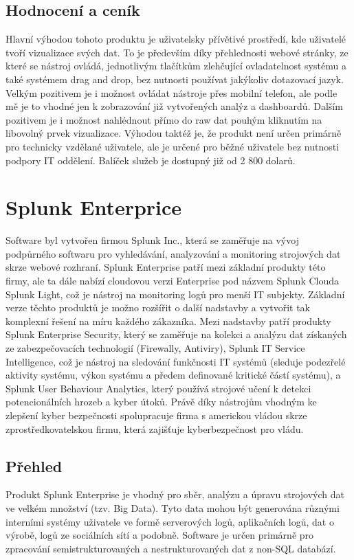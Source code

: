 \documentclass[czech,BP]{thesiskiv}
\begin{document}
\subsection{Hodnocení a ceník}
Hlavní výhodou tohoto produktu je uživatelsky přívětivé prostředí, kde uživatelé tvoří vizualizace svých dat. To je především díky přehlednosti webové stránky, ze které se nástroj ovládá, jednotlivým tlačítkům zlehčující ovladatelnost systému a také systémem drag and drop, bez nutnosti používat jakýkoliv dotazovací jazyk. Velkým pozitivem je i možnost ovládat nástroje přes mobilní telefon, ale podle mě je to vhodné jen k zobrazování již vytvořených analýz a dashboardů. Dalším pozitivem je i možnost nahlédnout přímo do raw dat pouhým kliknutím na libovolný prvek vizualizace. Výhodou taktéž je, že produkt není určen primárně pro technicky vzdělané uživatele, ale je určené pro běžné uživatele bez nutnosti podpory IT oddělení. Balíček služeb je dostupný již od 2 800 dolarů.\cite{InetCenik}

\section{Splunk Enterprice}
Software byl vytvořen firmou Splunk Inc., která se zaměřuje na vývoj podpůrného softwaru pro vyhledávání, analyzování a monitoring strojových dat skrze webové rozhraní.\cite{Splunk_a_kompatibilita} Splunk Enterprise patří mezi základní produkty této firmy, ale ta dále nabízí cloudovou verzi Enterprise pod názvem Splunk Cloud\texttrademark a Splunk Light, což je nástroj na monitoring logů pro menší IT subjekty. Základní verze těchto produktů je možno rozšířit o další nadstavby a vytvořit tak komplexní řešení na míru každého zákazníka. Mezi nadstavby patří produkty Splunk Enterprise Security, který se zaměřuje na kolekci a analýzu dat získaných ze zabezpečovacích technologií (Firewally, Antiviry), Splunk IT Service Intelligence, což je nástroj na sledování funkčnosti IT systémů (sleduje podezřelé aktivity systému, výkon systému a předem definované kritické částí systému), a Splunk User Behaviour Analytics, který používá strojové učení k detekci potencionálních hrozeb a kyber útoků. Právě díky nástrojům vhodným ke zlepšení kyber bezpečnosti spolupracuje firma s americkou vládou skrze zprostředkovatelskou firmu, která zajišťuje kyberbezpečnost pro vládu.\cite{Splunk_security}

\subsection{Přehled}
Produkt Splunk Enterprise je vhodný pro sběr, analýzu a úpravu strojových dat ve velkém množství (tzv. Big Data). Tyto data mohou být generována různými interními systémy uživatele ve formě serverových logů, aplikačních logů, dat o výrobě, logů ze sociálních sítí a podobně. Software je určen primárně pro zpracování semistrukturovaných a nestrukturovaných dat z non-SQL databází.
\end{document}
